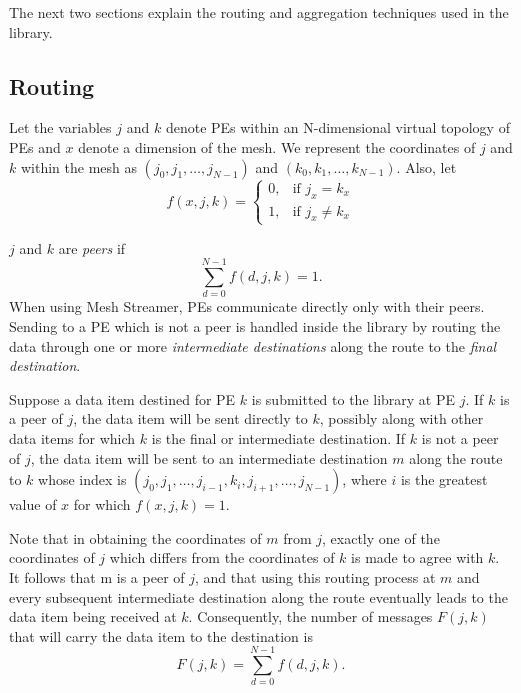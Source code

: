 
The next two sections explain the routing and aggregation techniques
used in the library.

\subsection{Routing}

Let the variables $j$ and $k$ denote PEs within an N-dimensional
virtual topology of PEs and $x$ denote a dimension of the mesh. We
represent the coordinates of $j$ and $k$ within the mesh as $\left
(j_0, j_1, \ldots, j_{N-1} \right) $ and $ \left (k_0, k_1, \ldots,
k_{N-1} \right) $.  Also, let
\[
f(x, j, k) = 
\begin{cases} 
0, & \text{if } j_x = k_x \\
1, & \text{if } j_x \ne k_x
\end{cases}
\]

$j$ and $k$ are \emph{peers} if 
\begin{equation}
\sum_{d=0}^{N-1} f(d, j, k) = 1 .
\label{eq:peer}
\end{equation}
When using Mesh Streamer, PEs communicate directly only with their
peers. Sending to a PE which is not a peer is handled inside the
library by routing the data through one or more \emph{intermediate
  destinations} along the route to the \emph{final destination}.

Suppose a data item destined for PE $k$ is submitted to the library at
PE $j$. If $k$ is a peer of $j$, the data item will be sent directly
to $k$, possibly along with other data items for which $k$ is the
final or intermediate destination.  If $k$ is not a peer of $j$, the
data item will be sent to an intermediate destination $m$ along the
route to $k$ whose index is $\left (j_0, j_1, \ldots, j_{i-1}, k_i,
j_{i+1}, \ldots, j_{N-1} \right)$, where $i$ is the greatest value of
$x$ for which $f(x, j, k) = 1$.

Note that in obtaining the coordinates of $m$ from $j$, exactly one of
the coordinates of $j$ which differs from the coordinates of $k$ is
made to agree with $k$. It follows that m is a peer of $j$, and that
using this routing process at $m$ and every subsequent intermediate
destination along the route eventually leads to the data item being
received at $k$. Consequently, the number of messages $F(j, k)$ that
will carry the data item to the destination is
\begin{equation}
F(j,k) = \sum_{d=0}^{N-1}f(d, j, k) .
\label{eq:nummsgs}
\end{equation}

